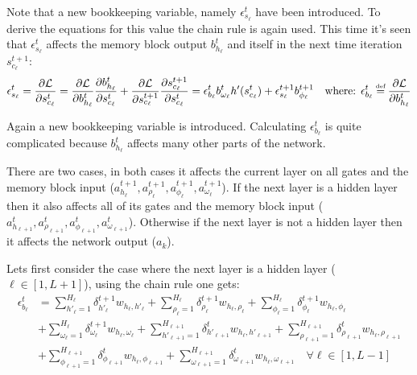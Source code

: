 Note that a new bookkeeping variable, namely $\epsilon_{s_\ell}^t$ have been introduced. To derive the equations for this value the chain rule is again used. This time it's seen that $\epsilon_{s_\ell}^t$ affects the memory block output $b_{h_\ell}^t$ and itself in the next time iteration $s_{c_\ell}^{t+1}$:
\begin{equation*}
\epsilon_{s_\ell}^t
= \frac{\partial \mathcal{L}}{\partial s_{c_\ell}^t}
= \frac{\partial \mathcal{L}}{\partial b_{h_\ell}^t}\frac{\partial b_{h_\ell}^t}{\partial s_{c_\ell}^t} + \frac{\partial \mathcal{L}}{\partial s_{c_\ell}^{t+1}} \frac{\partial s_{c_\ell}^{t+1}}{\partial s_{c_\ell}^t}
= \epsilon_{b_\ell}^t b_{\omega_\ell}^t h'(s_{c_\ell}^t) + \epsilon_{s_\ell}^{t+1} b_{\phi_\ell}^{t+1}
\quad \text{where: } \epsilon_{b_\ell}^t \defeq \frac{\partial \mathcal{L}}{\partial b_{h_\ell}^t}
\end{equation*}

Again a new bookkeeping variable is introduced. Calculating $\epsilon_{b_\ell}^t$ is quite complicated because $b_{h_\ell}^t$ affects many other parts of the network.

There are two cases, in both cases it affects the current layer on all gates and the memory block input ($a_{h_\ell}^{t+1}, a_{\rho_\ell}^{t+1}, a_{\phi_\ell}^{t+1}, a_{\omega_\ell}^{t+1}$). If the next layer is a hidden layer then it also affects all of its gates and the memory block input ($a_{h_{\ell+1}}^t, a_{\rho_{\ell+1}}^t, a_{\phi_{\ell+1}}^t, a_{\omega_{\ell+1}}^t$). Otherwise if the next layer is not a hidden layer then it affects the network output ($a_k$).

Lets first consider the case where the next layer is a hidden layer ($\ell \in [1, L+1]$), using the chain rule one gets:
\begin{equation}
\begin{aligned}
\epsilon_{b_\ell}^t &=
	\sum_{h'_\ell=1}^{H_\ell} \delta_{h'_\ell}^{t+1} w_{h_\ell, h'_\ell}
	+ \sum_{\rho_\ell=1}^{H_\ell} \delta_{\rho_\ell}^{t+1} w_{h_\ell, \rho_\ell}
	+ \sum_{\phi_\ell=1}^{H_\ell} \delta_{\phi_\ell}^{t+1} w_{h_\ell, \phi_\ell} \\
&+
	 \sum_{\omega_\ell=1}^{H_\ell} \delta_{\omega_\ell}^{t+1} w_{h_\ell, \omega_\ell}
	+ \sum_{h'_{\ell+1}=1}^{H_{\ell+1}} \delta_{h'_{\ell+1}}^t w_{h_\ell, h'_{\ell+1}}
	+ \sum_{\rho_{\ell+1}=1}^{H_{\ell+1}} \delta_{\rho_{\ell+1}}^t w_{h_\ell, \rho_{\ell+1}} \\
&+
	\sum_{\phi_{\ell+1}=1}^{H_{\ell+1}} \delta_{\phi_{\ell+1}}^t w_{h_\ell, \phi_{\ell+1}}
	+ \sum_{\omega_{\ell+1}=1}^{H_{\ell+1}} \delta_{\omega_{\ell+1}}^t w_{h_\ell, \omega_{\ell+1}}
	\quad \forall \ell \in [1, L - 1]
\end{aligned}
\end{equation}

